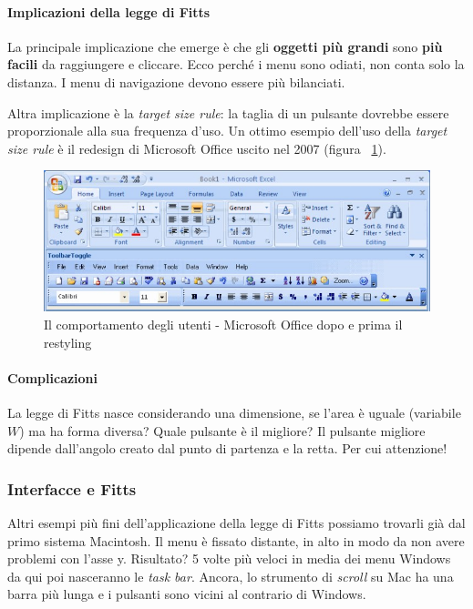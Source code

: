 				\paragraph{Implicazioni della legge di Fitts}
					La principale implicazione che emerge è che gli \textbf{oggetti più grandi} sono \textbf{più facili} da raggiungere e cliccare. Ecco perché i menu sono odiati, non conta solo la distanza. I menu di navigazione devono essere più bilanciati. 
					
					Altra implicazione è la \emph{target size rule}: la taglia di un pulsante dovrebbe essere proporzionale alla sua frequenza d'uso. Un ottimo esempio dell'uso della \emph{target size rule} è il redesign di Microsoft Office uscito nel 2007 (figura ~\ref{fig:ImplicazioniDellaLeggeDiFitts}).
					
					\begin{figure} [h]
						\centering
						\includegraphics[width=\textwidth]{images/IlComportamentoDegliUtenti-ImplicazioniDellaLeggeDiFitts}
						\caption[Il comportamento degli utenti - Microsoft Office dopo e prima il restyling]{Il comportamento degli utenti - Microsoft Office dopo e prima il restyling}
						\label{fig:ImplicazioniDellaLeggeDiFitts}
					\end{figure}
				
				\paragraph{Complicazioni}
					La legge di Fitts nasce considerando una dimensione, se l'area è uguale (variabile $W$) ma ha forma diversa? Quale pulsante è il migliore? Il pulsante migliore dipende dall'angolo creato dal punto di partenza e la retta. Per cui attenzione!
					
			\subsubsection{Interfacce e Fitts}
				Altri esempi più fini dell'applicazione della legge di Fitts possiamo trovarli già dal primo sistema Macintosh. Il menu è fissato distante, in alto in modo da non avere problemi con l'asse y. Risultato? 5 volte più veloci in media dei menu Windows da qui poi nasceranno le \emph{task bar}. Ancora, lo strumento di \emph{scroll} su Mac ha una barra più lunga e i pulsanti sono vicini al contrario di Windows.
				
